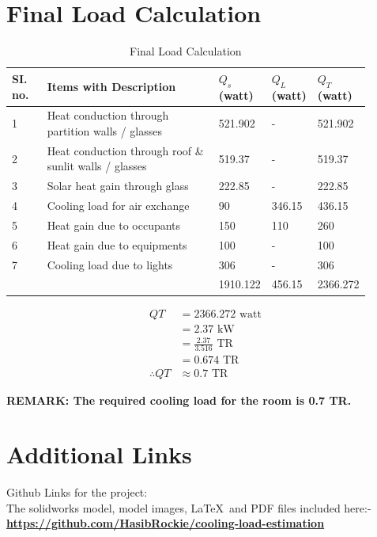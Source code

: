 \documentclass{article}
\begin{document}
    \section{Final Load Calculation}
    \begin{table}[ht]
      \centering
      \begin{adjustbox}{width=\textwidth}
      \begin{tabularx}{\linewidth}{p{0.10\linewidth} p{0.5\linewidth} p{0.10\linewidth} p{0.10\linewidth} p{0.10\linewidth}}
          \hline
          \textbf{SI. no.} & \textbf{Items with Description} & \textbf{$Q_s$ (watt)} & \textbf{$Q_L$ (watt)} & \textbf{$Q_T$ (watt)} \\
          \hline
          1 & Heat conduction through partition walls / glasses & 521.902 & - & 521.902 \\
          2 & Heat conduction through roof \& sunlit walls / glasses & 519.37 & - & 519.37 \\
          3 & Solar heat gain through glass  & 222.85 & - & 222.85 \\
          4 & Cooling load for air exchange & 90 & 346.15 & 436.15 \\
          5 & Heat gain due to occupants & 150 & 110 & 260 \\
          6 & Heat gain due to equipments & 100 & - & 100 \\
          7 & Cooling load due to lights & 306 & - & 306 \\
          \hline
          && 1910.122 & 456.15 & 2366.272 \\
      \end{tabularx}
      \end{adjustbox}
      \caption{Final Load Calculation}
      \label{tab:Final Calculation}
      \end{table}

      \begin{align*}
        QT &= 2366.272 \text{ watt} \\
        &= 2.37 \text{ kW} \\
        &= \frac{2.37}{3.516} \text{ TR} \\
        &= 0.674 \text{ TR} \\
        \therefore QT &\approx 0.7 \text{ TR}
      \end{align*}

      \textbf{REMARK: The required cooling load for the room is 0.7 TR.}

      \section{Additional Links}
      Github Links for the project: \\
      The solidworks model, model images, \LaTeX\,  and PDF files included here:- \\ 
      
      \textbf{\href{https://github.com/HasibRockie/cooling-load-estimation}{https://github.com/HasibRockie/cooling-load-estimation}}
\end{document}
